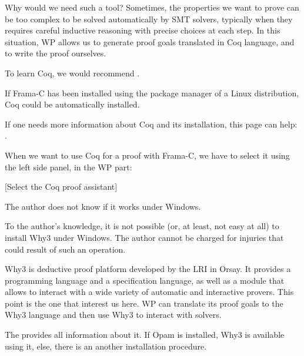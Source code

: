 Why would we need such a tool? Sometimes, the properties we want to
prove can be too complex to be solved automatically by SMT solvers,
typically when they requires careful inductive reasoning with precise
choices at each step. In this situation, WP allows us to generate proof
goals translated in Coq language, and to write the proof ourselves.




To learn Coq, we would recommend
.



\begin{Information}
  If Frama-C has been installed using the package manager of a Linux
  distribution, Coq could be automatically installed.
\end{Information}


If one needs more information about Coq and its installation, this page
can help: .



When we want to use Coq for a proof with Frama-C, we have to select it
using the left side panel, in the WP part:



[Select the Coq proof assistant]


\begin{Information}
  The author does not know if it works under Windows.
\end{Information}




\begin{Warning}
  To the author's knowledge, it is not possible (or, at least, not easy
  at all) to install Why3 under Windows. The author cannot be charged for
  injuries that could result of such an operation.
\end{Warning}


Why3 is deductive proof platform developed by the LRI in Orsay. It
provides a programming language and a specification language, as well as
a module that allows to interact with a wide variety of automatic and
interactive provers. This point is the one that interest us here. WP can
translate its proof goals to the Why3 language and then use Why3 to
interact with solvers.



The  provides all information
about it. If Opam is installed, Why3 is available using it, else, there
is an another installation procedure.



